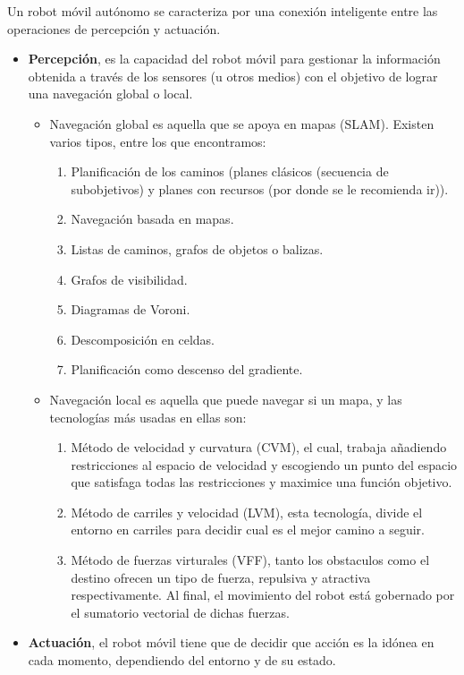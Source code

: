 \begin{itemize}
Un robot móvil autónomo se caracteriza por una conexión inteligente entre las operaciones de percepción y actuación.
\begin{itemize}
  \item \textbf{Percepción}, es la capacidad del robot móvil para gestionar la información obtenida a través de los sensores (u otros medios) con el objetivo de lograr una navegación global o local.
   \begin{itemize}
    \item Navegación global es aquella que se apoya en mapas (SLAM). Existen varios tipos, entre los que encontramos:
      \begin{enumerate}
	\item Planificación de los caminos (planes clásicos (secuencia de subobjetivos) y planes con recursos (por donde se le recomienda ir)).
	\item Navegación basada en mapas.
	\item Listas de caminos, grafos de objetos o balizas.
	\item Grafos de visibilidad.
	\item Diagramas de Voroni.
	\item Descomposición en celdas.
	\item Planificación como descenso del gradiente.
      \end{enumerate}
    \item Navegación local es aquella que puede navegar si un mapa, y las tecnologías más usadas en ellas son:
      \begin{enumerate}
	\item Método de velocidad y curvatura (CVM), el cual, trabaja añadiendo restricciones al espacio de velocidad y escogiendo un punto del espacio que satisfaga todas las restricciones y maximice una función objetivo.
	\item Método de carriles y velocidad (LVM), esta tecnología, divide el entorno en carriles para decidir cual es el mejor camino a seguir.
	\item Método de fuerzas virturales (VFF), tanto los obstaculos como el destino ofrecen un tipo de fuerza, repulsiva y atractiva respectivamente. Al final, el movimiento del robot está gobernado por el sumatorio vectorial de dichas fuerzas.
      \end{enumerate}
   \end{itemize}
  \item \textbf{Actuación}, el robot móvil tiene que de decidir que acción es la idónea en cada momento, dependiendo del entorno y de su estado.
\end{itemize}
\end{itemize}


